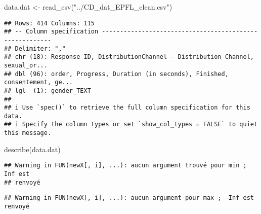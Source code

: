 \documentclass[
]{article}
\newenvironment{Shaded}{\begin{snugshade}}{\end{snugshade}}
\newcommand{\FunctionTok}[1]{\textcolor[rgb]{0.00,0.00,0.00}{#1}}
\newcommand{\NormalTok}[1]{#1}
\newcommand{\OtherTok}[1]{\textcolor[rgb]{0.56,0.35,0.01}{#1}}
\newcommand{\SpecialCharTok}[1]{\textcolor[rgb]{0.00,0.00,0.00}{#1}}
\newcommand{\StringTok}[1]{\textcolor[rgb]{0.31,0.60,0.02}{#1}}
\begin{document}
\begin{Shaded}
\begin{Highlighting}[]
\NormalTok{data.dat }\OtherTok{\textless{}{-}} \FunctionTok{read\_csv}\NormalTok{(}\StringTok{"../CD\_dat\_EPFL\_clean.csv"}\NormalTok{)}
\end{Highlighting}
\end{Shaded}

\begin{verbatim}
## Rows: 414 Columns: 115
## -- Column specification --------------------------------------------------------
## Delimiter: ","
## chr (18): Response ID, DistributionChannel - Distribution Channel, sexual_or...
## dbl (96): order, Progress, Duration (in seconds), Finished, consentement, ge...
## lgl  (1): gender_TEXT
## 
## i Use `spec()` to retrieve the full column specification for this data.
## i Specify the column types or set `show_col_types = FALSE` to quiet this message.
\end{verbatim}

\begin{Shaded}
\end{Shaded}

\begin{Shaded}
\begin{Highlighting}[]
\FunctionTok{describe}\NormalTok{(data.dat)}
\end{Highlighting}
\end{Shaded}

\begin{verbatim}
## Warning in FUN(newX[, i], ...): aucun argument trouvé pour min ; Inf est
## renvoyé
\end{verbatim}

\begin{verbatim}
## Warning in FUN(newX[, i], ...): aucun argument pour max ; -Inf est renvoyé
\end{verbatim}
\end{document}
